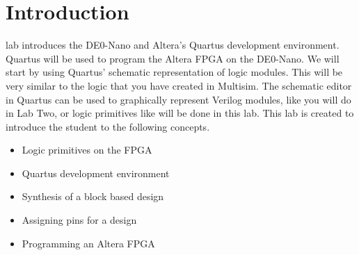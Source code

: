 \documentclass[12pt,journal]{IEEEtran}
\begin{document}




  \section{Introduction}
     lab introduces the DE0-Nano and Altera's Quartus development environment. Quartus will be
    used to program the Altera FPGA on the DE0-Nano. We will start by using Quartus' schematic representation of logic modules. 
    This will be very similar to the logic that you have created in Multisim. The schematic editor in Quartus can be
    used to graphically represent Verilog modules, like you will do in Lab Two, or logic primitives like will be done
    in this lab. This lab is created to introduce the student to the following concepts.
    \begin{itemize}
       \item Logic primitives on the FPGA
       \item Quartus development environment
       \item Synthesis of a block based design
       \item Assigning pins for a design
       \item Programming an Altera FPGA
    \end{itemize}
\end{document}
